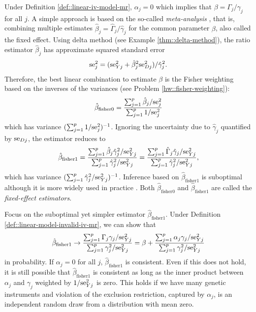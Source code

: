 Under Definition \ref{def::linear-iv-model-mr},  $\alpha_j = 0$ which implies that $\beta = \Gamma_j / \gamma_j$ for all $j$. A simple approach is based on the so-called {\it meta-analysis} \citep{bowden2018improving}, that is, combining multiple estimates $\hat{\beta}_j =  \hat \Gamma_j / \hat\gamma_j$ for the common parameter $\beta$, also called the fixed effect. Using delta method (see Example \ref{thm::delta-method}), the ratio estimator $\hat{\beta}_j$ has approximate squared standard error 
$$
\textup{se}_j^2 = (\textup{se}_{Yj}^2 + \hat{\beta}_j^2\textup{se}_{Dj}^2  )    / \hat\gamma_j^2.
$$
Therefore, the best linear combination to estimate $\beta$ is  the Fisher weighting based on the inverses of the variances (see Problem \ref{hw::fisher-weighting}):
$$
\hat{\beta}_{\text{fisher}0} =  \frac{ \sum_{j=1}^p  \hat{\beta}_j  / \textup{se}_j^2  }{ \sum_{j=1}^p 1  / \textup{se}_j^2 }
$$
which has variance $(\sum_{j=1}^p 1  / \textup{se}_j^2)^{-1} $. Ignoring the uncertainty due to  $\hat\gamma_j$ quantified by $\textup{se}_{Dj}$, the estimator reduces to
$$
\hat{\beta}_{\text{fisher}1} =  \frac{ \sum_{j=1}^p  \hat{\beta}_j  \hat\gamma_j^2 /  \textup{se}_{Yj}^2 }{ \sum_{j=1}^p   \hat\gamma_j^2 /  \textup{se}_{Yj}^2 }
=\frac{ \sum_{j=1}^p  \hat \Gamma_j   \hat\gamma_j /  \textup{se}_{Yj}^2 }{ \sum_{j=1}^p   \hat\gamma_j^2 /  \textup{se}_{Yj}^2 },
$$
which has variance $( \sum_{j=1}^p   \hat\gamma_j^2 /  \textup{se}_{Yj}^2 )^{-1}$. Inference based on $\hat{\beta}_{\text{fisher}1} $ is suboptimal although it is more widely used in practice \citep{bowden2018improving}. 
Both $\hat{\beta}_{\text{fisher}0}$ and $\hat{\beta}_{\text{fisher}1}$ are called the {\it fixed-effect estimators}. 


Focus on the suboptimal yet simpler estimator $\hat{\beta}_{\text{fisher}1}$. Under Definition \ref{def::linear-model-invalid-iv-mr},  we can show that 
$$
\hat{\beta}_{\text{fisher}1}  \rightarrow 
\frac{ \sum_{j=1}^p   \Gamma_j    \gamma_j /  \textup{se}_{Yj}^2 }{ \sum_{j=1}^p    \gamma_j^2 /  \textup{se}_{Yj}^2 }
= \beta + \frac{ \sum_{j=1}^p   \alpha_j    \gamma_j /  \textup{se}_{Yj}^2 }{ \sum_{j=1}^p    \gamma_j^2 /  \textup{se}_{Yj}^2 }
$$
in probability. 
If $\alpha_j = 0$ for all $j$, $\hat{\beta}_{\text{fisher}1} $ is consistent. Even if this does not hold, it is still possible that $\hat{\beta}_{\text{fisher}1}  $ is consistent as long as the inner product between $\alpha_j  $ and $  \gamma_j$ weighted by $ 1/  \textup{se}_{Yj}^2$ is zero. This holds if we have many genetic instruments and violation of the exclusion restriction, captured by $\alpha_j$, is an independent random draw from a distribution with mean zero. 



